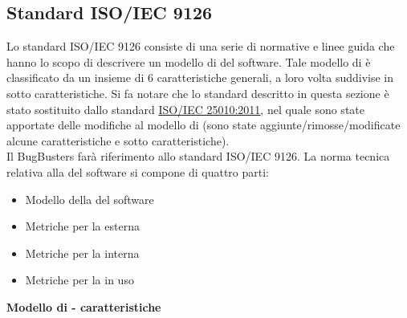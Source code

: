 \subsection{Standard ISO/IEC 9126}\label{AppQualitaProdotto}
Lo standard ISO/IEC 9126 consiste di una serie di normative e linee guida che hanno lo scopo di descrivere un modello di  del software. 
Tale modello di  è classificato da un insieme di 6 caratteristiche generali, a loro volta suddivise in sotto caratteristiche.
Si fa notare che lo standard descritto in questa sezione è stato sostituito dallo standard \href{http://www.iso.org/iso/iso_catalogue/catalogue_tc/catalogue_detail.htm?csnumber=35733}{ISO/IEC 25010:2011}, nel quale sono state apportate delle modifiche al modello di  (sono state aggiunte/rimosse/modificate alcune caratteristiche e sotto caratteristiche).\\
Il  BugBusters farà riferimento allo standard ISO/IEC 9126.
La norma tecnica relativa alla  del software si compone di quattro parti:
\begin{itemize}
\item Modello della  del software
\item Metriche per la  esterna
\item Metriche per la  interna
\item Metriche per la  in uso
\end{itemize}
\textbf{Modello di  - caratteristiche}
